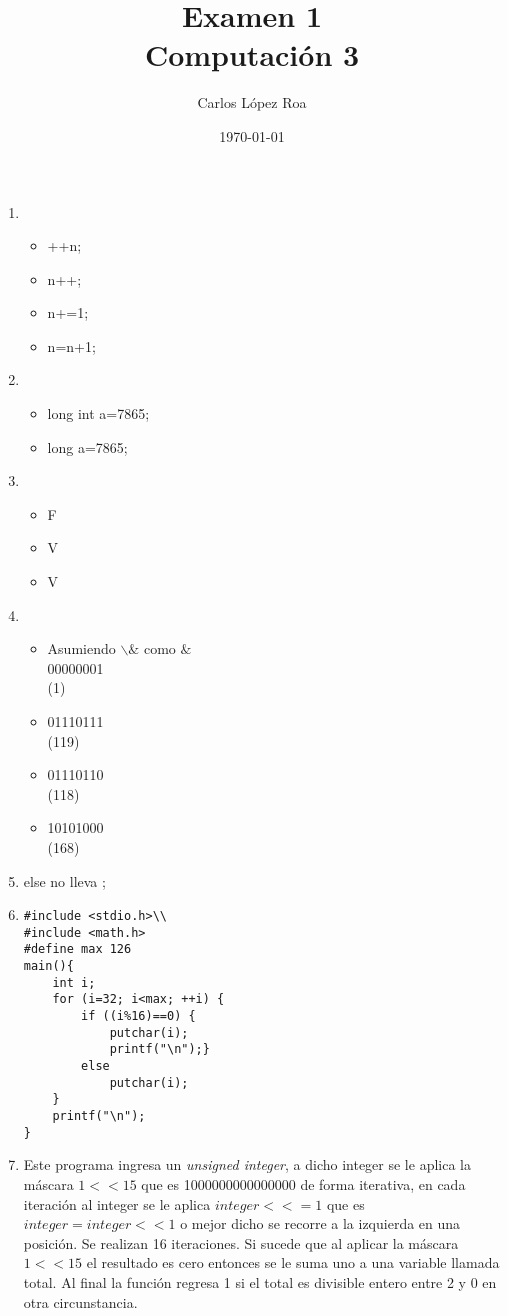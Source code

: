 \documentclass[a4paper,10pt]{article}
\title{Examen 1\\ Computación 3}
\author{Carlos López Roa}
\date{\today}
\begin{document}
\maketitle
\begin{enumerate}
\item \begin{itemize}
\item ++n;
\item n++;
\item n+=1;
\item n=n+1;
\end{itemize}
\item
 \begin{itemize}
\item long int a=7865;
\item long a=7865;
\end{itemize}
\item \begin{itemize}
\item F
\item V
\item V
\end{itemize}
\item 
\begin{itemize}
\item Asumiendo $\backslash \&$ como $\&$\\
00000001\\
(1)
\item 01110111\\
(119)
\item 01110110\\
(118)
\item 10101000\\
(168)
\end{itemize}
\item else no lleva ;
\item \begin{verbatim}
#include <stdio.h>\\
#include <math.h>
#define max 126
main(){
    int i;
    for (i=32; i<max; ++i) {
        if ((i%16)==0) {
            putchar(i); 
            printf("\n");}
        else 
            putchar(i);
    }
    printf("\n");
}
 \end{verbatim}
\item 
Este programa ingresa un \emph{unsigned integer}, a  dicho integer se le aplica la máscara $1<<15$ que es 1000000000000000 de forma iterativa, en cada iteración al integer se le aplica $integer<<=1$ que es $integer = integer << 1$ o mejor dicho se recorre a la izquierda en una posición. Se realizan 16 iteraciones. Si sucede que al aplicar la máscara $1<<15 $ el resultado es cero entonces se le suma uno a una variable llamada total. Al final la función regresa 1 si el total es divisible entero entre 2 y 0 en otra circunstancia. \\

\end{enumerate}
\end{document}
